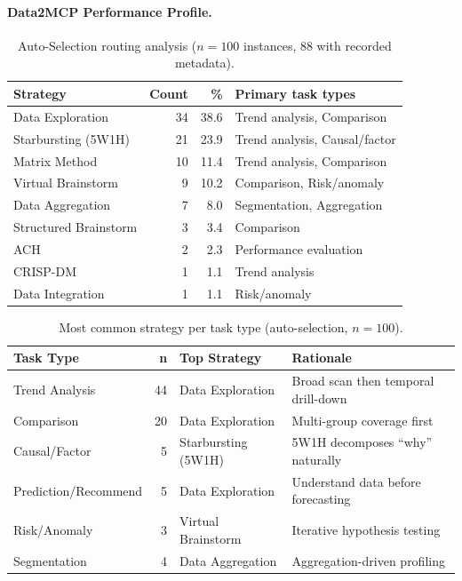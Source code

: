 \paragraph{Data2MCP Performance Profile.}

\begin{table}[t]
  \caption{Auto-Selection routing analysis ($n=100$ instances, 88 with recorded metadata).}
  \label{tab:routing}
  \centering
  \small
  \begin{tabular}{lrrl}
    \toprule
    Strategy & Count & \% & Primary task types \\
    \midrule
    Data Exploration     & 34 & 38.6 & Trend analysis, Comparison \\
    Starbursting (5W1H)  & 21 & 23.9 & Trend analysis, Causal/factor \\
    Matrix Method        & 10 & 11.4 & Trend analysis, Comparison \\
    Virtual Brainstorm   &  9 &  10.2 & Comparison, Risk/anomaly \\
    Data Aggregation     &  7 &  8.0 & Segmentation, Aggregation \\
    Structured Brainstorm &  3 &  3.4 & Comparison \\
    ACH                  &  2 &  2.3 & Performance evaluation \\
    CRISP-DM             &  1 &  1.1 & Trend analysis \\
    Data Integration     &  1 &  1.1 & Risk/anomaly \\
    \bottomrule
  \end{tabular}
\end{table}

\begin{table}[t]
  \caption{Most common strategy per task type (auto-selection, $n=100$).}
  \label{tab:routing_task}
  \centering
  \small
  \begin{tabular}{lrll}
    \toprule
    Task Type & n & Top Strategy & Rationale \\
    \midrule
    Trend Analysis        & 44 & Data Exploration    & Broad scan then temporal drill-down \\
    Comparison            & 20 & Data Exploration    & Multi-group coverage first \\
    Causal/Factor         &  5 & Starbursting (5W1H) & 5W1H decomposes ``why'' naturally \\
    Prediction/Recommend  &  5 & Data Exploration    & Understand data before forecasting \\
    Risk/Anomaly          &  3 & Virtual Brainstorm  & Iterative hypothesis testing \\
    Segmentation          &  4 & Data Aggregation    & Aggregation-driven profiling \\
    \bottomrule
  \end{tabular}
\end{table}

